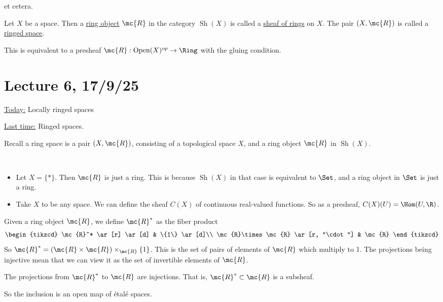 \documentclass[x11names,reqno,14pt]{extarticle}
\DeclareMathOperator{\Sh}{Sh}
\begin{document}
et cetera. 


Let $X$ be a space. Then a \underline{ring object} $\mc{R}$ in the category $\Sh(X)$ is called a \underline{sheaf of rings} on $X$. The pair $(X,\mc{R})$ is called a \underline{ringed space}. 

This is equivalent to a presheaf $\mc{R}:\operatorname{Open}(X)^{op} \to \Ring$ with the gluing condition. 

\section*{Lecture 6, 17/9/25}

\underline{Today:} Locally ringed spaces

\underline{Last time:} Ringed spaces.

Recall a ring space is a pair $(X,\mc{R})$, consisting of a topological space $X$, and a ring object $\mc{R}$ in $\Sh(X)$. 

\exm
\,
\begin{itemize} 

\item Let $X = \{*\}$. Then $\mc{R}$ is just a ring. This is because $\Sh(X)$ in that case is equivalent to $\Set$, and a ring object in $\Set$ is just a ring. 

\item Take $X$ to be any space. We can define the sheaf $C(X)$ of continuous real-valued functions. So as a presheaf, $C(X)(U) = \Hom(U,\R)$. 

\end{itemize}

 Given a ring object $\mc{R}$, we define $\mc{R}^*$ as the fiber product
\[
\begin{tikzcd}
\mc{R}^* \ar[r] \ar[d] & \{1\} \ar[d]\\
\mc{R}\times\mc{R} \ar[r, "\cdot"] & \mc{R}
\end{tikzcd}
\]
So $\mc{R}^* = (\mc{R}\times\mc{R})\times_{\mc{R}}\{1\}$. This is the set of pairs of elements of $\mc{R}$ which multiply to 1. The projections being injective mean that we can view it as the set of invertible elements of $\mc{R}$.

\claim

The projections from $\mc{R}^*$ to $\mc{R}$ are injections. That is, $\mc{R}^* \subset \mc{R}$ is a subsheaf. 

So the inclusion is an open map of \'etal\'e spaces. 

\end{document}
